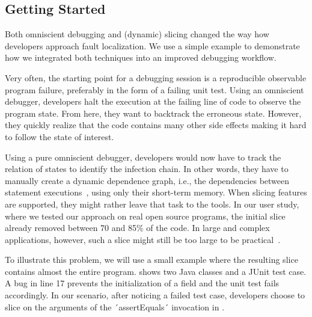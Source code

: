 \documentclass[
			english,
			]{elsarticle}
\begin{document}
\subsection{Getting Started}

Both omniscient debugging and (dynamic) slicing changed the way how developers approach fault localization.
We use a simple example to demonstrate how we integrated both techniques into an improved debugging workflow.

Very often, the starting point for a debugging session is a reproducible observable program failure, preferably in the form of a failing unit test.
Using an omniscient debugger, developers halt the execution at the failing line of code to observe the program state.
From here, they want to backtrack the erroneous state.
However, they quickly realize that the code contains many other side effects making it hard to follow the state of interest.

Using a pure omniscient debugger, developers would now have to track the relation of states to identify the infection chain. 
In other words, they have to manually create a dynamic dependence graph, i.e., the dependencies between statement executions~\cite{korel_dynamic_1990}, using only their short-term memory. 
When slicing features are supported, they might rather leave that task to the tools.
In our user study, where we tested our approach on real open source programs, the initial slice already removed between 70 and 85\% of the code.
In large and complex applications, however, such a slice might still be too large to be practical~\cite{agrawal_dynamic_1990, Sridharan:2007:TS:1273442.1250748}.

To illustrate this problem, we will use a small example where the resulting slice contains almost the entire program.
shows two Java classes and a JUnit test case. %
A bug in line 17 prevents the initialization of a field and the unit test fails accordingly.
In our scenario, after noticing a failed test case, developers choose to slice on the arguments of the ´assertEquals´ invocation in .
\end{document}
